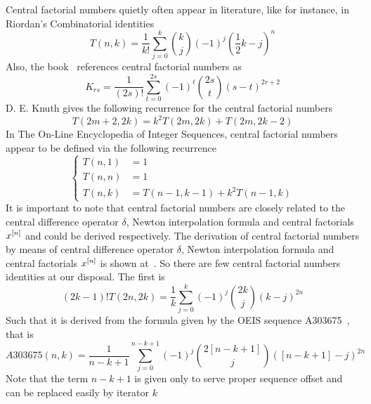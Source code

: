 Central factorial numbers quietly often appear in literature, like for instance, in Riordan's
Combinatorial identities~\cite{riordan1968combinatorial}
\begin{equation}
    T(n,k) = \frac{1}{k!} \sum_{j=0}^{k} \binom{k}{j} (-1)^{j} \left( \frac{1}{2}k - j \right)^{n}\label{eq:cfn-riordan}
\end{equation}
Also, the book~\cite{carlitz_riordan_1963} references central factorial numbers as
\begin{equation*}
    K_{rs} = \frac{1}{(2s)!} \sum_{t=0}^{2s} (-1)^t \binom{2s}{t} (s-t)^{2r+2}
\end{equation*}
D. E. Knuth gives the following recurrence for the central factorial numbers~\cite{knuth1993johann}
\begin{equation*}
    T(2m+2, 2k) = k^2 T(2m,2k) + T(2m, 2k - 2)
\end{equation*}
In The On-Line Encyclopedia of Integer Sequences, central factorial numbers appear to be defined
via the following recurrence
\begin{equation*}
    \begin{cases}
        T(n,1) &=1 \\
        T(n,n) &=1 \\
        T(n,k) &=T(n-1, k-1) + k^2 T(n-1, k)
    \end{cases}
\end{equation*}
It is important to note that central factorial numbers are closely related to the central difference operator $\delta$,
Newton interpolation formula and central factorials $x^{[n]}$ and could be derived respectively.
The derivation of central factorial numbers by means of central difference operator $\delta$,
Newton interpolation formula and central factorials $x^{[n]}$
is shown at~\cite{scheuer2020mathstackexchange}.
So there are few central factorial numbers identities at our disposal.
The first is
\begin{equation}
(2k-1)
    !T(2n,2k) = \frac{1}{k} \sum_{j=0}^{k} (-1)^j \binom{2k}{j} (k-j)^{2n}\label{eq:cfn-identity-1}
\end{equation}
Such that it is derived from the formula given by the OEIS sequence A303675~\cite{kolosov2018coefficients}, that is
\begin{equation*}
    A303675(n,k) = \frac{1}{n-k+1} \sum_{j=0}^{n-k+1} (-1)^{j} \binom{2[n-k+1]}{j} ([n-k+1]-j)^{2n}
\end{equation*}
Note that the term $n-k+1$ is given only to serve proper sequence offset and can be replaced easily by iterator $k$
